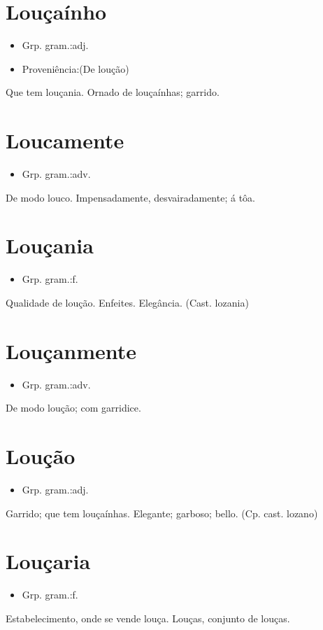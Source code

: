 \section{Louçaínho}
\begin{itemize}
\item {Grp. gram.:adj.}
\end{itemize}
\begin{itemize}
\item {Proveniência:(De \textunderscore loução\textunderscore )}
\end{itemize}
Que tem louçania.
Ornado de louçaínhas; garrido.
\section{Loucamente}
\begin{itemize}
\item {Grp. gram.:adv.}
\end{itemize}
De modo louco.
Impensadamente, desvairadamente; á tôa.
\section{Louçania}
\begin{itemize}
\item {Grp. gram.:f.}
\end{itemize}
Qualidade de loução.
Enfeites.
Elegância.
(Cast. \textunderscore lozania\textunderscore )
\section{Louçanmente}
\begin{itemize}
\item {Grp. gram.:adv.}
\end{itemize}
De modo loução; com garridice.
\section{Loução}
\begin{itemize}
\item {Grp. gram.:adj.}
\end{itemize}
Garrido; que tem louçaínhas.
Elegante; garboso; bello.
(Cp. cast. \textunderscore lozano\textunderscore )
\section{Louçaria}
\begin{itemize}
\item {Grp. gram.:f.}
\end{itemize}
Estabelecimento, onde se vende louça.
Louças, conjunto de louças.
